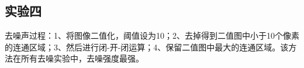\documentclass[12pt]{article}
\begin{document}
\subsection{实验四}
    去噪声过程：1、将图像二值化，阈值设为10；2、去掉得到二值图中小于10个像素的连通区域；3、然后进行闭-开-闭运算；4、保留二值图中最大的连通区域。该方法在所有去噪实验中，去噪强度最强。
\end{document}
